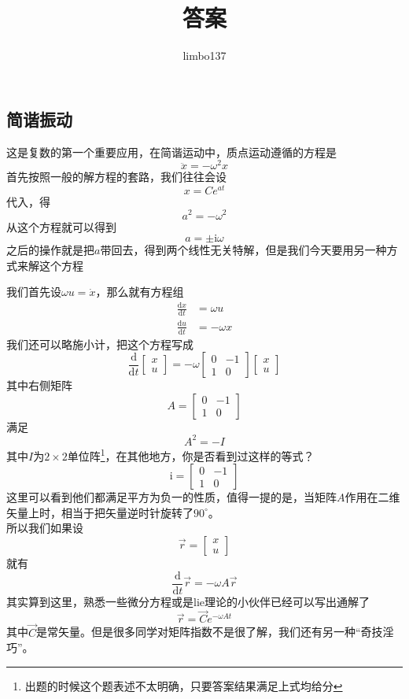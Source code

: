 \documentclass[UTF8]{ctexart}
\title{答案}
\author{limbo137}
\begin{document}
\maketitle
\subsection{简谐振动}
这是复数的第一个重要应用，在简谐运动中，质点运动遵循的方程是
\[\ddot{x} = -\omega^2 x\]
首先按照一般的解方程的套路，我们往往会设
\[x = Ce^{at}\]
代入，得
\[a^2 = -\omega^2\]
从这个方程就可以得到
\[a = \pm \mathrm{i} \omega\]
之后的操作就是把$a$带回去，得到两个线性无关特解，但是我们今天要用另一种方式来解这个方程

我们首先设$\omega u=\dot{x}$，那么就有方程组
\begin{equation}
    \begin{split}
        \frac{\mathrm{d} x}{\mathrm{d} t}&= \omega u \\
        \frac{\mathrm{d} u}{\mathrm{d} t }&= -\omega x  
    \end{split}
\end{equation}
我们还可以略施小计，把这个方程写成
\[\frac{\mathrm{d}}{\mathrm{d} t}\begin{bmatrix}x\\u\end{bmatrix}= -\omega
\begin{bmatrix}
    0&-1\\
    1&0
\end{bmatrix}
\begin{bmatrix}x\\u\end{bmatrix}  \]
其中右侧矩阵
\[A = \begin{bmatrix}
    0&-1\\
    1&0
\end{bmatrix}\]
满足
\[A^2 = -I\]
其中$I$为$2 \times 2$单位阵\footnote{出题的时候这个题表述不太明确，只要答案结果满足上式均给分}，在其他地方，你是否看到过这样的等式？
\[\mathrm{i} = \begin{bmatrix}
    0&-1\\
    1&0
\end{bmatrix}\]
这里可以看到他们都满足平方为负一的性质，值得一提的是，当矩阵$A$作用在二维矢量上时，相当于把矢量逆时针旋转了$90^\circ $。
\\
所以我们如果设
\[\vec{r}=\begin{bmatrix}x\\u\end{bmatrix}\]
就有
\[\frac{\mathrm{d}}{\mathrm{d} t}\vec{r}= -\omega A \vec{r}\]
其实算到这里，熟悉一些微分方程或是lie理论的小伙伴已经可以写出通解了
\[\vec{r}=\vec{C}e^{-\omega A t}\]
其中$\vec{C}$是常矢量。但是很多同学对矩阵指数不是很了解，我们还有另一种“奇技淫巧”。
\end{document}
